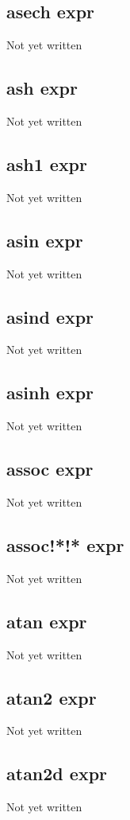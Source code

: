 \documentclass[a4paper,11pt]{article}
\begin{document}
{\subsection{\ttfamily asech expr}
   Not yet written

\subsection{\ttfamily ash expr}
   Not yet written

\subsection{\ttfamily ash1 expr}
   Not yet written

\subsection{\ttfamily asin expr}
   Not yet written

\subsection{\ttfamily asind expr}
   Not yet written

\subsection{\ttfamily asinh expr}
   Not yet written

\subsection{\ttfamily assoc expr}
   Not yet written

\subsection{\ttfamily assoc!*!* expr}
   Not yet written

\subsection{\ttfamily atan expr}
   Not yet written

\subsection{\ttfamily atan2 expr}
   Not yet written

\subsection{\ttfamily atan2d expr}
   Not yet written

}
\end{document}
